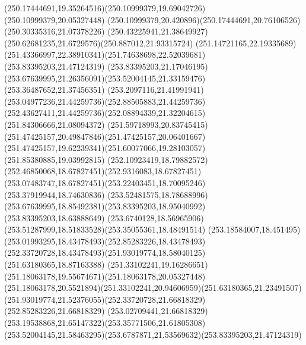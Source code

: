 {{	\curveto(250.17444691,19.35264516)(250.10999379,19.69042726)(250.10999379,20.05327448)
	\curveto(250.10999379,20.420896)(250.17444691,20.76106526)(250.30335316,21.07378226)
	\curveto(250.43225941,21.38649927)(250.62681235,21.6729576)(250.887012,21.93315724)
	\curveto(251.14721165,22.19335689)(251.43366997,22.38910341)(251.74638698,22.52039681)
	\closepath
	\moveto(253.83395203,21.47124319)
	\lineto(253.83395203,21.17046195)
	\curveto(253.67639995,21.26356091)(253.52004145,21.33159476)(253.36487652,21.37456351)
	\curveto(253.2097116,21.41991941)(253.04977236,21.44259736)(252.88505883,21.44259736)
	\curveto(252.43627411,21.44259736)(252.08894339,21.32204615)(251.84306666,21.08094372)
	\curveto(251.59718993,20.83745415)(251.47425157,20.49847846)(251.47425157,20.06401667)
	\curveto(251.47425157,19.62239341)(251.60077066,19.28103057)(251.85380885,19.03992815)
	\curveto(252.10923419,18.79882572)(252.46850068,18.67827451)(252.9316083,18.67827451)
	\curveto(253.07483747,18.67827451)(253.22403451,18.70095246)(253.37919944,18.74630836)
	\curveto(253.52481575,18.78688996)(253.67639995,18.85492381)(253.83395203,18.95040992)
	\lineto(253.83395203,18.63888649)
	\curveto(253.6740128,18.56965906)(253.51287999,18.51833528)(253.35055361,18.48491514)
	\curveto(253.18584007,18.451495)(253.01993295,18.43478493)(252.85283226,18.43478493)
	\curveto(252.33720728,18.43478493)(251.93019774,18.58040125)(251.63180365,18.87163388)
	\curveto(251.33102241,19.16286651)(251.18063178,19.55674671)(251.18063178,20.05327448)
	\curveto(251.18063178,20.5521894)(251.33102241,20.94606959)(251.63180365,21.23491507)
	\curveto(251.93019774,21.52376055)(252.33720728,21.66818329)(252.85283226,21.66818329)
	\curveto(253.02709441,21.66818329)(253.19538868,21.65147322)(253.35771506,21.61805308)
	\curveto(253.52004145,21.58463295)(253.6787871,21.53569632)(253.83395203,21.47124319)
	\closepath
}
}
